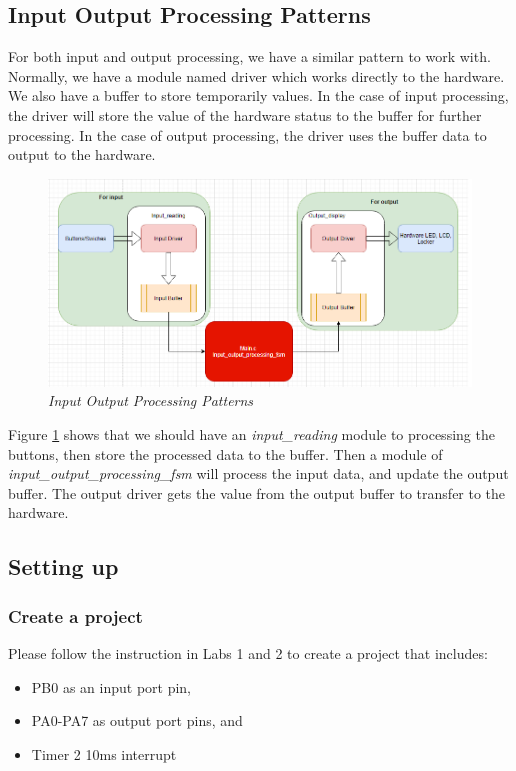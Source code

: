 \subsection{Input Output Processing Patterns}
For both input and output processing, we have a similar pattern to work with. Normally, we have a module named driver which works directly to the hardware. We also have a buffer to store temporarily values. In the case of input processing, the driver will store the value of the hardware status to the buffer for further processing. In the case of output processing, the driver uses the buffer data to output to the hardware. 

\begin{figure}[!htp]
    \centering
    \includegraphics[width=5.5in]{source/picture/bai_3/Input_Output_patterns.png}
    \caption{\textit{Input Output Processing Patterns}}
    \label{bai4_pic_Input_Output_patterns}
\end{figure}

Figure \ref{bai4_pic_Input_Output_patterns} shows that we should have an \emph{input\_reading} module to processing the buttons, then store the processed data to the buffer. Then a module of \emph{input\_output\_processing\_fsm} will process the input data, and update the output buffer. The output driver gets the value from the output buffer to transfer to the hardware. 
\newpage
\subsection{Setting up}
\subsubsection{Create a project}
Please follow the instruction in Labs 1 and 2 to create a project that includes: 
\begin{itemize}
    \item PB0 as an input port pin, 
    \item PA0-PA7 as output port pins, and 
    \item Timer 2 10ms interrupt
\end{itemize}

